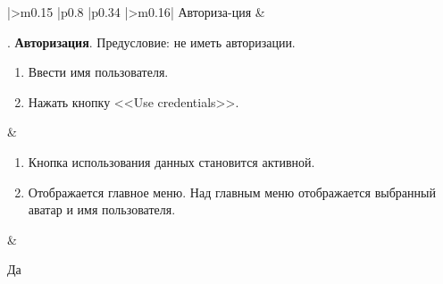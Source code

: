 \begin{landscape}
\begin{longtable}[l]{|>{\centering}m{0.15\textwidth}
					  |p{0.8\textwidth}
					  |p{0.34\textwidth}
					  |>{\centering\arraybackslash}m{0.16\textwidth}|}
    \hline
	Авториза-ция &
	\begin{minipage}[t]{1\linewidth}
		\vspace{-1\baselineskip}
		\testnumber. \textbf{Авторизация}.\newline
 		Предусловие: не иметь авторизации.
 		\begin{enumerate}
 			\item Ввести имя пользователя.
 			\item Нажать кнопку <<Use credentials>>.
 		\end{enumerate}
 	\end{minipage} &
	\begin{minipage}[t]{1\linewidth}
		\vspace{-1\baselineskip}
		\begin{enumerate}
			\item Кнопка использования данных становится активной.
			\item Отображается главное меню. Над главным меню отображается выбранный аватар и имя пользователя.
		\end{enumerate}
	\end{minipage} \newline &
	\begin{minipage}[t]{1\linewidth}
		\vspace{-1\baselineskip}
		\centering Да
	\end{minipage} \\
	\hline


\end{longtable}
\end{landscape}
